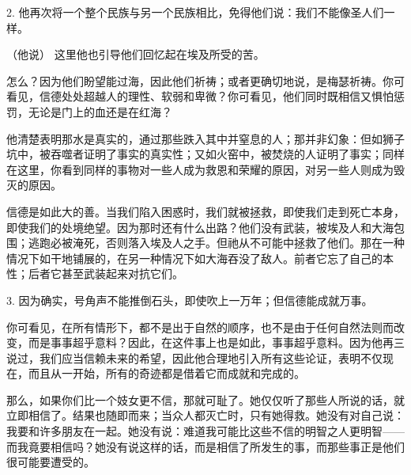 2.  他再次将一个整个民族与另一个民族相比，免得他们说：我们不能像圣人们一样。\par

（他说） 这里他也引导他们回忆起在埃及所受的苦。\par

怎么？因为他们盼望能过海，因此他们祈祷；或者更确切地说，是梅瑟祈祷。你可看见，信德处处超越人的理性、软弱和卑微？你可看见，他们同时既相信又惧怕惩罚，无论是门上的血还是在红海？\par

他清楚表明那水是真实的，通过那些跌入其中并窒息的人；那并非幻象：但如狮子坑中，被吞噬者证明了事实的真实性；又如火窑中，被焚烧的人证明了事实；同样在这里，你看到同样的事物对一些人成为救恩和荣耀的原因，对另一些人则成为毁灭的原因。\par

信德是如此大的善。当我们陷入困惑时，我们就被拯救，即使我们走到死亡本身，即使我们的处境绝望。因为那时还有什么出路？他们没有武装，被埃及人和大海包围；逃跑必被淹死，否则落入埃及人之手。但祂从不可能中拯救了他们。那在一种情况下如干地铺展的，在另一种情况下如大海吞没了敌人。前者它忘了自己的本性；后者它甚至武装起来对抗它们。\par

3.  因为确实，号角声不能推倒石头，即使吹上一万年；但信德能成就万事。\par

你可看见，在所有情形下，都不是出于自然的顺序，也不是由于任何自然法则而改变，而是事事超乎意料？因此，在这件事上也是如此，事事超乎意料。因为他再三说过，我们应当信赖未来的希望，因此他合理地引入所有这些论证，表明不仅现在，而且从一开始，所有的奇迹都是借着它而成就和完成的。\par

 那么，如果你们比一个妓女更不信，那就可耻了。她仅仅听了那些人所说的话，就立即相信了。结果也随即而来；当众人都灭亡时，只有她得救。她没有对自己说：我要和许多朋友在一起。她没有说：难道我可能比这些不信的明智之人更明智——而我竟要相信吗？她没有说这样的话，而是相信了所发生的事，而那些事正是他们很可能要遭受的。\par


\subsection{}

